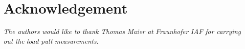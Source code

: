 \documentclass[journal]{IEEEtran}
\begin{document}
\section*{Acknowledgement}
{\itshape
The authors would like to thank Thomas Maier at Fraunhofer IAF for carrying out
the load-pull measurements.
}


%
%
\end{document}
